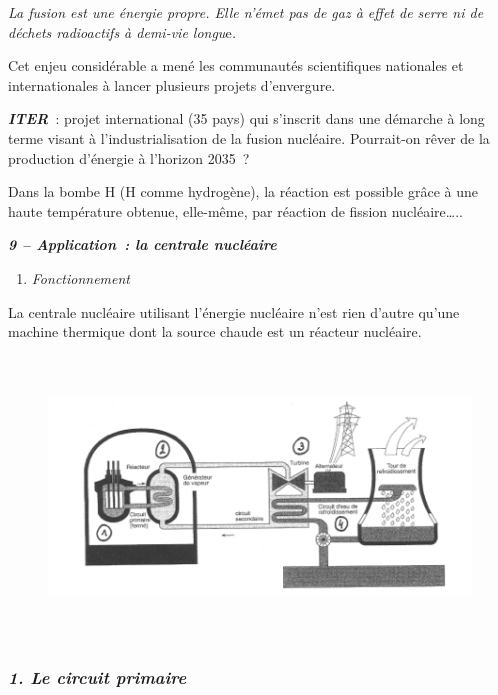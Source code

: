 \emph{\emph{La fusion est une énergie propre}.\emph{ Elle n'émet pas de
gaz à effet de serre ni de déchets radioactifs à demi-vie
longu}}e\emph{.}

Cet enjeu considérable a mené les communautés scientifiques nationales
et internationales à lancer plusieurs projets d'envergure.

\emph{\textbf{ITER}}~: projet international (35 pays) qui s'inscrit dans
une démarche à long terme visant à l'industrialisation de la fusion
nucléaire. Pourrait-on rêver de la production d'énergie à l'horizon
2035~?

Dans la bombe H (H comme hydrogène), la réaction est possible grâce à
une haute température obtenue, elle-même, par réaction de fission
nucléaire\ldots..

\emph{\textbf{9 -- Application~: la centrale nucléaire}}

\begin{enumerate}
\def\labelenumi{\alph{enumi})}
\tightlist
\item
  \emph{Fonctionnement}
\end{enumerate}

La centrale nucléaire utilisant l'énergie nucléaire n'est rien d'autre
qu'une machine thermique dont la source chaude est un réacteur
nucléaire.

\begin{figure}
\centering
\includegraphics[width=15.898cm,height=7.479cm]{Pictures/10000001000001C3000000D48AB61C0B764D908D.png}
\caption{}
\end{figure}

\hypertarget{le-circuit-primaire}{%
\subsubsection{\texorpdfstring{\emph{\textbf{1. Le circuit
primaire}}}{1. Le circuit primaire}}\label{le-circuit-primaire}}

